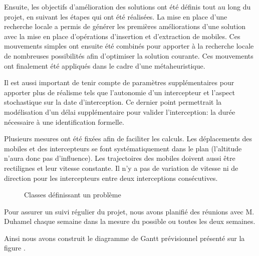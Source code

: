 		Ensuite, les objectifs d'amélioration des solutions ont été définis tout au long du projet, en suivant les étapes qui ont été réalisées. La mise en place d'une recherche locale a permis de générer les premières améliorations d'une solution avec la mise en place d'opérations d'insertion et d'extraction de mobiles. Ces mouvements simples ont ensuite été combinés pour apporter à la recherche locale de nombreuses possibilités afin d'optimiser la solution courante. Ces mouvements ont finalement été appliqués dans le cadre d'une métaheuristique.
		
		Il est aussi important de tenir compte de paramètres supplémentaires pour apporter plus de réalisme tels que l'autonomie d'un intercepteur et l'aspect stochastique sur la date d'interception. Ce dernier point permettrait la modélisation d'un délai supplémentaire pour valider l'interception: la durée nécessaire à une identification formelle.
		
		
		Plusieurs mesures ont été fixées afin de faciliter les calculs. Les déplacements des mobiles et des intercepteurs se font systématiquement dans le plan (l'altitude n'aura donc pas d'influence). Les trajectoires des mobiles doivent aussi être rectilignes et leur vitesse constante. Il n'y a pas de variation de vitesse ni de direction pour les intercepteurs entre deux interceptions consécutives.

		\begin{figure}[h!]
			\centering
			\begin{tikzpicture}
				
			\end{tikzpicture}
			\caption{Classes définissant un problème}
			\label{fig:problem-uml}
		\end{figure}

		Pour assurer un suivi régulier du projet, nous avons planifié des réunions avec M. Duhamel chaque semaine dans la mesure du possible ou toutes les deux semaines.

		Ainsi nous avons construit le diagramme de Gantt prévisionnel présenté sur la figure .
		
